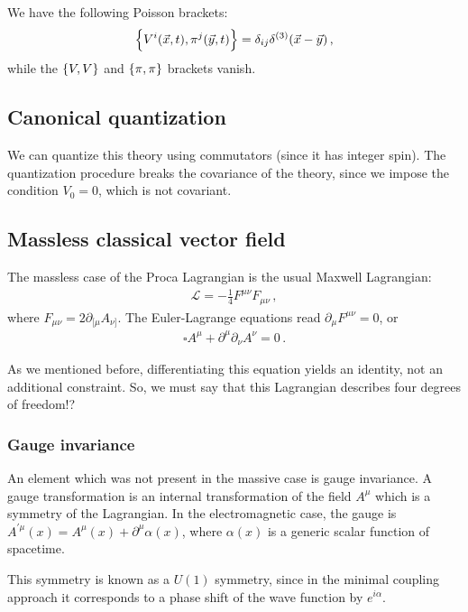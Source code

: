 \documentclass[main.tex]{subfiles}
\begin{document}
We have the following Poisson brackets: 
%
\begin{align}
\qty{V^{i} (\vec{x}, t), \pi^{j}(\vec{y}, t)} = \delta_{ij} \delta^{(3)} (\vec{x} - \vec{y})
\,,
\end{align}
%
while the \(\qty{V, V}\) and \(\qty{\pi, \pi }\) brackets vanish. 

\subsection{Canonical quantization}

We can quantize this theory using commutators (since it has integer spin).
The quantization procedure breaks the covariance of the theory, since we impose the condition \(V_0 = 0\), which is not covariant. 

\subsection{Massless classical vector field}

The massless case of the Proca Lagrangian is the usual Maxwell Lagrangian: 
%
\begin{align}
\mathscr{L} = - \frac{1}{4} F^{\mu \nu } F_{\mu \nu }
\,,
\end{align}
%
where \(F_{\mu \nu } = 2 \partial_{[\mu } A_{\nu ]}\). 
The Euler-Lagrange equations read \(\partial_{\mu } F^{\mu \nu } = 0\), or 
%
\begin{align}
\square A^{\mu } + \partial^{\mu } \partial_{\nu } A^{\nu } = 0
\,.
\end{align}

As we mentioned before, differentiating this equation yields an identity, not an additional constraint. So, we must say that this Lagrangian describes four degrees of freedom!?

\subsubsection{Gauge invariance}

An element which was not present in the massive case is gauge invariance. A gauge transformation is an internal transformation of the field \(A^{\mu } \) which is a symmetry of the Lagrangian. In the electromagnetic case, the gauge is \(A^{\prime \mu } (x) = A^{\mu } (x) + \partial^{\mu } \alpha (x)\), where \(\alpha (x)\) is a generic scalar function of spacetime. 

This symmetry is known as a \(U(1)\) symmetry, since in the minimal coupling approach it corresponds to a phase shift of the wave function by \(e^{i \alpha }\). 
\end{document}
